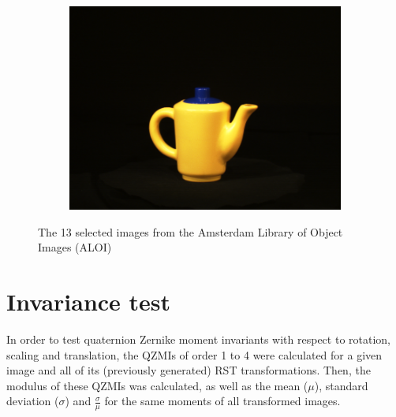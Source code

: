 \begin{figure}[tbp]
\begin{subfigure}{80pt}
    \includegraphics[width=\textwidth]{figures/aloi_original/875.png}
    \caption{}
	\end{subfigure}
	\caption{The 13 selected images from the Amsterdam Library of Object Images (ALOI)}
	\label{fig:aloi_original}

\end{figure}

\section{Invariance test}
In order to test quaternion Zernike moment invariants with respect to rotation, scaling and translation, the QZMIs of order 1 to 4 were calculated for a given image and all of its (previously generated) RST transformations. Then, the modulus of these QZMIs was calculated, as well as the mean ($\mu$), standard deviation ($\sigma$) and $\frac{\sigma}{\mu}$ for the same moments of all transformed images.

